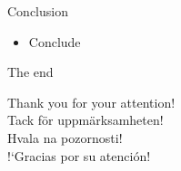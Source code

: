 \documentclass{beamer}
\begin{document}
\begin{frame}{ Conclusion }
\begin{itemize}
\item Conclude
\end{itemize}
\end{frame}


\begin{frame}{ The end }
\begin{center}
Thank you for your attention! \\
Tack för uppmärksamheten! \\
Hvala na pozornosti! \\
!`Gracias por su atención! 
\end{center}

\end{frame}
\end{document}
